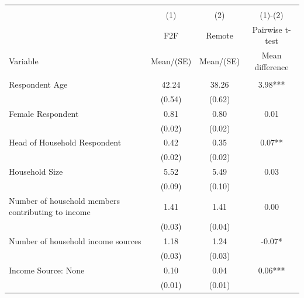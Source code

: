 
\begin{tabular}{@{\extracolsep{5pt}}lccc}
\\[-1.8ex]\hline \hline \\[-1.8ex]
 & \multicolumn{1}{c}{(1)}  & \multicolumn{1}{c}{(2)}  & \multicolumn{1}{c}{(1)-(2)} \\
 & \multicolumn{1}{c}{F2F}  & \multicolumn{1}{c}{Remote}  & \multicolumn{1}{c}{Pairwise t-test}  \\
Variable & Mean/(SE) & Mean/(SE) & Mean difference \\ \hline \\[-1.8ex] 
Respondent Age   & 42.24    & 38.26    & 3.98***   \\
 & (0.54)  & (0.62)  &  \\ [1ex]
Female Respondent   & 0.81    & 0.80    & 0.01   \\
 & (0.02)  & (0.02)  &  \\ [1ex]
Head of Household Respondent   & 0.42    & 0.35    & 0.07**   \\
 & (0.02)  & (0.02)  &  \\ [1ex]
Household Size   & 5.52    & 5.49    & 0.03   \\
 & (0.09)  & (0.10)  &  \\ [1ex]
Number of household members contributing to income   & 1.41    & 1.41    & 0.00   \\
 & (0.03)  & (0.04)  &  \\ [1ex]
Number of household income sources   & 1.18    & 1.24    & -0.07*   \\
 & (0.03)  & (0.03)  &  \\ [1ex]
Income Source: None   & 0.10    & 0.04    & 0.06***   \\
 & (0.01)  & (0.01)  &  \\ [1ex]

\end{tabular}
